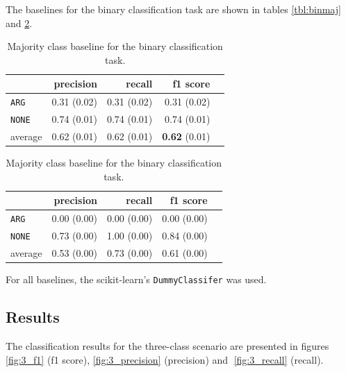 The baselines for the binary classification task are shown in tables \ref{tbl:binmaj} and \ref{tbl:binstrat}.


\begin{table}[!htb]
    \begin{minipage}{.5\linewidth}
      \caption{Random (stratified) baseline for the binary classification task.}
      \label{tbl:binmaj}
      \centering
      
\begin{tabular}{@{}lrrrr@{}}
\toprule
 	&	 precision &	 recall &	 f1 score  \\ \midrule 
\texttt{ARG}	&	 0.31 \scriptsize{(0.02)} &	 0.31 \scriptsize{(0.02)} &	 0.31 \scriptsize{(0.02)}  \\ 
\texttt{NONE}	&	 0.74 \scriptsize{(0.01)} &	 0.74 \scriptsize{(0.01)} &	 0.74 \scriptsize{(0.01)}  \\ 
average	&	 0.62 \scriptsize{(0.01)} &	 0.62 \scriptsize{(0.01)} &	 \textbf{0.62} \scriptsize{(0.01)}  \\ 
\bottomrule
\end{tabular}

  \end{minipage}%
    \begin{minipage}{.5\linewidth}
      \centering
        \caption{Majority class baseline for the binary classification task.}
        \label{tbl:binstrat}
\begin{tabular}{@{}lrrrr@{}}
\toprule
 	&	 precision &	 recall &	 f1 score  \\ \midrule 
\texttt{ARG}	&	 0.00 \scriptsize{(0.00)} &	 0.00 \scriptsize{(0.00)} &	 0.00 \scriptsize{(0.00)}  \\ 
\texttt{NONE}	&	 0.73 \scriptsize{(0.00)} &	 1.00 \scriptsize{(0.00)} &	 0.84 \scriptsize{(0.00)}  \\ 
average	&	 0.53 \scriptsize{(0.00)} &	 0.73 \scriptsize{(0.00)} &	 0.61 \scriptsize{(0.00)}  \\ 
\bottomrule
\end{tabular}
    \end{minipage} 
\end{table}


For all baselines, the scikit-learn's \texttt{DummyClassifer} was used.


\subsection{Results}
\label{sec:3_results}
The classification results for the three-class scenario are presented in figures \ref{fig:3_f1} (f1 score), \ref{fig:3_precision} (precision) and \ref{fig:3_recall} (recall).

